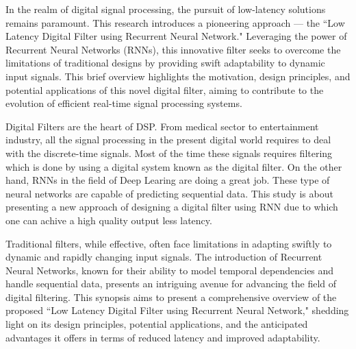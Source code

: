 In the realm of digital signal processing, the pursuit of low-latency solutions remains paramount. This research introduces a pioneering approach — the ``Low Latency Digital Filter using Recurrent Neural Network." Leveraging the power of Recurrent Neural Networks (RNNs), this innovative filter seeks to overcome the limitations of traditional designs by providing swift adaptability to dynamic input signals. This brief overview highlights the motivation, design principles, and potential applications of this novel digital filter, aiming to contribute to the evolution of efficient real-time signal processing systems.

Digital Filters are the heart of DSP. From medical sector to entertainment industry, all the signal processing in the present digital world requires to deal with the discrete-time signals. Most of the time these signals requires filtering which is done by using a digital system known as the digital filter. On the other hand, RNNs in the field of Deep Learing are doing a great job. These type of neural networks are capable of predicting sequential data. This study is about presenting a new approach of designing a digital filter using RNN due to which one can achive a high quality output less latency.

Traditional filters, while effective, often face limitations in adapting swiftly to dynamic and rapidly changing input signals. The introduction of Recurrent Neural Networks, known for their ability to model temporal dependencies and handle sequential data, presents an intriguing avenue for advancing the field of digital filtering. This synopsis aims to present a comprehensive overview of the proposed ``Low Latency Digital Filter using Recurrent Neural Network," shedding light on its design principles, potential applications, and the anticipated advantages it offers in terms of reduced latency and improved adaptability.